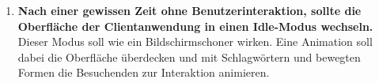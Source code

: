 \begin{enumerate}[label=\textbf{FA\arabic*}]
{  Management System (CMS) zu verwalten.}\\
  Die Inhalte, gerade die Artikel über das Museum und andere Projekte, sollen redaktionell verwaltbar sein. Dies soll über ein 
  intuitiv zu bedienendes CMS möglich sein. 
  \item\label{fa8} \textbf{Nach einer gewissen Zeit ohne Benutzerinteraktion, sollte die Oberfläche der Clientanwendung in einen
  Idle-Modus wechseln.}\\
  Dieser Modus soll wie ein Bildschirmschoner wirken. Eine Animation soll dabei die Oberfläche überdecken und mit Schlagwörtern 
  und bewegten Formen die Besuchenden zur Interaktion animieren. 
\end{enumerate}
